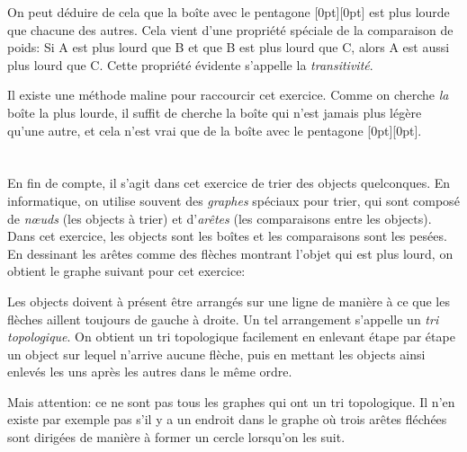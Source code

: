 {{On peut déduire de cela que la boîte avec le pentagone \raisebox{-0.5ex}[0pt][0pt]{} est plus lourde que chacune des autres. Cela vient d’une propriété spéciale de la comparaison de poids: Si A est plus lourd que B et que B est plus lourd que C, alors A est aussi plus lourd que C. Cette propriété évidente s’appelle la \emph{transitivité}.

Il existe une méthode maline pour raccourcir cet exercice. Comme on cherche \emph{la} boîte la plus lourde, il suffit de cherche la boîte qui n’est jamais plus légère qu’une autre, et cela n’est vrai que de la boîte avec le pentagone \raisebox{-0.5ex}[0pt][0pt]{}.



\section*{\BrochureItsInformatics}
En fin de compte, il s’agit dans cet exercice de trier des objects quelconques. En informatique, on utilise souvent des \emph{graphes} spéciaux pour trier, qui sont composé de \emph{nœuds} (les objects à trier) et d’\emph{arêtes} (les comparaisons entre les objects). Dans cet exercice, les objects sont les boîtes et les comparaisons sont les pesées. En dessinant les arêtes comme des flèches montrant l’objet qui est plus lourd, on obtient le graphe suivant pour cet exercice:

{\centering%
\par}

Les objects doivent à présent être arrangés sur une ligne de manière à ce que les flèches aillent toujours de gauche à droite. Un tel arrangement s’appelle un \emph{tri topologique}. On obtient un tri topologique facilement en enlevant étape par étape un object sur lequel n’arrive aucune flèche, puis en mettant les objects ainsi enlevés les uns après les autres dans le même ordre.

Mais attention: ce ne sont pas tous les graphes qui ont un tri topologique. Il n’en existe par exemple pas s’il y a un endroit dans le graphe où trois arêtes fléchées sont dirigées de manière à former un cercle lorsqu’on les suit.



}}

